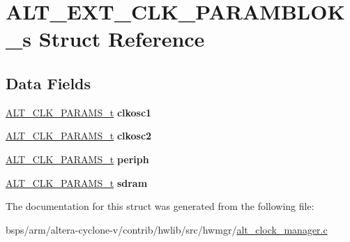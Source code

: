 \hypertarget{structALT__EXT__CLK__PARAMBLOK__s}{}\section{A\+L\+T\+\_\+\+E\+X\+T\+\_\+\+C\+L\+K\+\_\+\+P\+A\+R\+A\+M\+B\+L\+O\+K\+\_\+s Struct Reference}
\label{structALT__EXT__CLK__PARAMBLOK__s}
\subsection*{Data Fields}
\begin{DoxyCompactItemize}
\item 
\mbox{\label{structALT__EXT__CLK__PARAMBLOK__s_a5f780d6df5add37d302dc533256772fa}} 
\mbox{\hyperlink{structALT__CLK__PARAMS__s}{A\+L\+T\+\_\+\+C\+L\+K\+\_\+\+P\+A\+R\+A\+M\+S\+\_\+t}} {\bfseries clkosc1}
\item 
\mbox{\label{structALT__EXT__CLK__PARAMBLOK__s_a1914c7519e8d8fabd55f1d76b954a5c7}} 
\mbox{\hyperlink{structALT__CLK__PARAMS__s}{A\+L\+T\+\_\+\+C\+L\+K\+\_\+\+P\+A\+R\+A\+M\+S\+\_\+t}} {\bfseries clkosc2}
\item 
\mbox{\label{structALT__EXT__CLK__PARAMBLOK__s_ad67119a4cd6f6cbe4e78509f5bea5401}} 
\mbox{\hyperlink{structALT__CLK__PARAMS__s}{A\+L\+T\+\_\+\+C\+L\+K\+\_\+\+P\+A\+R\+A\+M\+S\+\_\+t}} {\bfseries periph}
\item 
\mbox{\label{structALT__EXT__CLK__PARAMBLOK__s_a9c8b217f665fd5fa7e557e1f464854ed}} 
\mbox{\hyperlink{structALT__CLK__PARAMS__s}{A\+L\+T\+\_\+\+C\+L\+K\+\_\+\+P\+A\+R\+A\+M\+S\+\_\+t}} {\bfseries sdram}
\end{DoxyCompactItemize}


The documentation for this struct was generated from the following file\+:\begin{DoxyCompactItemize}
\item 
bsps/arm/altera-\/cyclone-\/v/contrib/hwlib/src/hwmgr/\mbox{\hyperlink{alt__clock__manager_8c}{alt\+\_\+clock\+\_\+manager.\+c}}\end{DoxyCompactItemize}

